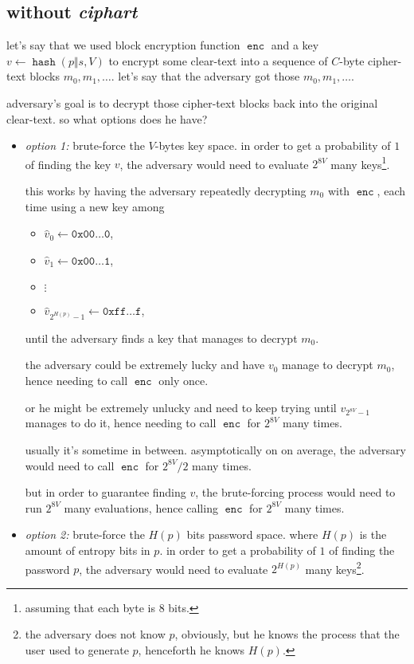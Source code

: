 \documentclass[twocolumn]{article}
\DeclareMathOperator{\enc}{\texttt{enc}}
\DeclareMathOperator{\hash}{\texttt{hash}}
\begin{document}
\subsection{without \emph{ciphart}}
let's say that we used block encryption function $\enc$ and a key $v \gets
\hash(p \Vert s, V)$ to encrypt some clear-text into a sequence of
$C$-byte cipher-text blocks $m_0, m_1, \ldots$.  let's say that the
adversary got those $m_0, m_1, \ldots$.

adversary's goal is to decrypt those cipher-text blocks back into the
original clear-text.  so what options does he have?
\begin{itemize}
    \item \emph{option 1:} brute-force the $V$-bytes key space.  in order
    to get a probability of $1$ of finding the key $v$, the adversary would
    need to evaluate $2^{8V}$ many keys\footnote{assuming that each
    byte is $8$ bits.}.

    this works by having the adversary repeatedly decrypting $m_0$ with
    $\enc$, each time using a new key among
    \begin{itemize}
        \item $\hat v_0 \gets \texttt{0x00\ldots 0}$,
        \item $\hat v_1 \gets \texttt{0x00\ldots 1}$,
        \item $\vdots$
        \item $\hat v_{2^{H(p)}-1} \gets \texttt{0xff\ldots f}$,
    \end{itemize}
    until the adversary finds a key that manages to decrypt $m_0$.

    the adversary could be extremely lucky and have $v_0$ manage to decrypt
    $m_0$, hence needing to call $\enc$ only once.  

    or he might be extremely unlucky and need to keep trying until
    $v_{2^{8V}-1}$ manages to do it, hence needing to call $\enc$ for
    $2^{8V}$ many times.

    usually it's sometime in between.  asymptotically on on average, the
    adversary would need to call $\enc$ for $2^{8V}/2$ many times.

    but in order to guarantee finding $v$, the brute-forcing process would
    need to run $2^{8V}$ many evaluations, hence calling $\enc$ for
    $2^{8V}$ many times.

    \item \emph{option 2:} brute-force the $H(p)$ bits password space.
    where $H(p)$ is the amount of entropy bits in $p$.  in order to get a
    probability of $1$ of finding the password $p$, the adversary would
    need to evaluate $2^{H(p)}$ many keys\footnote{the adversary does not
    know $p$, obviously, but he knows the process that the user used to
    generate $p$, henceforth he knows $H(p)$.}.


\end{itemize}
\end{document}

